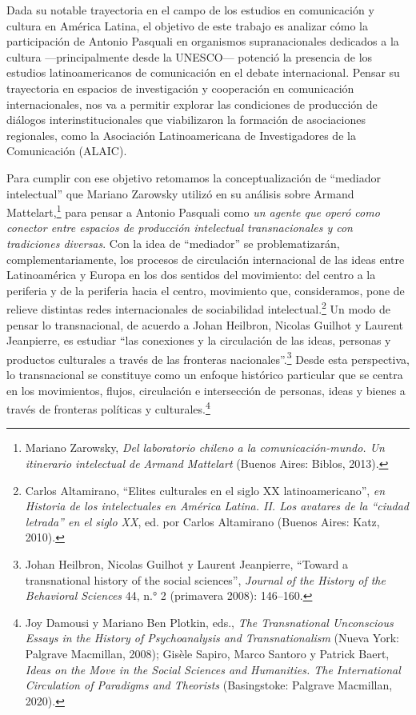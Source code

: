 \documentclass{tufte-handout}
\begin{document}
Dada su notable trayectoria en el campo de los estudios en comunicación
y cultura en América Latina, el objetivo de este trabajo es analizar
cómo la participación de Antonio Pasquali en organismos supranacionales
dedicados a la cultura ---principalmente desde la UNESCO--- potenció la
presencia de los estudios latinoamericanos de comunicación en el debate
internacional. Pensar su trayectoria en espacios de investigación y
cooperación en comunicación internacionales, nos va a permitir explorar
las condiciones de producción de diálogos interinstitucionales que
viabilizaron la formación de asociaciones regionales, como la Asociación
Latinoamericana de Investigadores de la Comunicación (ALAIC).

Para cumplir con ese objetivo retomamos la conceptualización de
``mediador intelectual'' que Mariano Zarowsky utilizó en su análisis
sobre Armand Mattelart,\footnote{Mariano Zarowsky, \emph{Del laboratorio
  chileno a la comunicación-mundo. Un itinerario intelectual de Armand
  Mattelart} (Buenos Aires: Biblos, 2013).} para pensar a Antonio
Pasquali como \emph{un agente que operó como conector entre espacios de
producción intelectual transnacionales y con tradiciones diversas}. Con
la idea de ``mediador'' se problematizarán, complementariamente, los
procesos de circulación internacional de las ideas entre Latinoamérica y
Europa en los dos sentidos del movimiento: del centro a la periferia y
de la periferia hacia el centro, movimiento que, consideramos, pone de
relieve distintas redes internacionales de sociabilidad
intelectual.\footnote{Carlos Altamirano, ``Elites culturales en el siglo
  XX latinoamericano'', \emph{en Historia de los intelectuales en
  América Latina. II. Los avatares de la ``ciudad letrada'' en el siglo
  XX}, ed. por Carlos Altamirano (Buenos Aires: Katz, 2010).} Un modo de
pensar lo transnacional, de acuerdo a Johan Heilbron, Nicolas Guilhot y
Laurent Jeanpierre, es estudiar ``las conexiones y la circulación de las
ideas, personas y productos culturales a través de las fronteras
nacionales''.\footnote{Johan Heilbron, Nicolas Guilhot y Laurent
  Jeanpierre, ``Toward a transnational history of the social sciences'',
  \emph{Journal of the History of the Behavioral Sciences} 44, n.° 2
  (primavera 2008): 146--160.} Desde esta perspectiva, lo transnacional
se constituye como un enfoque histórico particular que se centra en los
movimientos, flujos, circulación e intersección de personas, ideas y
bienes a través de fronteras políticas y culturales.\footnote{Joy
  Damousi y Mariano Ben Plotkin, eds., \emph{The Transnational
  Unconscious Essays in the History of Psychoanalysis and
  Transnationalism} (Nueva York: Palgrave Macmillan, 2008); Gisèle
  Sapiro, Marco Santoro y Patrick Baert, \emph{Ideas on the Move in the
  Social Sciences and Humanities. The International Circulation of
  Paradigms and Theorists} (Basingstoke: Palgrave Macmillan, 2020).}
\end{document}
